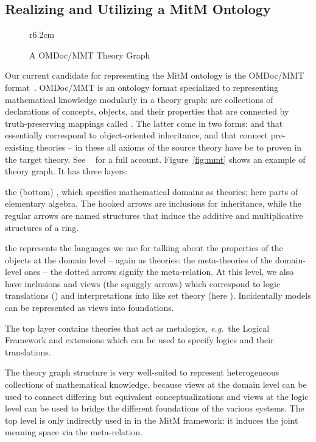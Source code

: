 \subsection{Realizing and Utilizing a MitM Ontology}

\begin{wrapfigure}r{6.2cm}\centering\vspace*{-2em}
  \vspace*{-.5em}
  \caption{A OMDoc/MMT Theory Graph}\label{fig:mmt}\vspace*{-1em}
  \label{figure.omdoc.example}
\end{wrapfigure}
Our current candidate for representing the MitM ontology is the OMDoc/MMT
format~\cite{Kohlhase:OMDoc1.2,MMTSVN:on}. OMDoc/MMT is an ontology format specialized to
representing mathematical knowledge modularly in a theory graph:  are
collections of declarations of concepts, objects, and their properties that are connected
by truth-preserving mappings called . The latter come in two
forms:  and  that essentially correspond to
object-oriented inheritance, and  that connect pre-existing theories -- in
these all axioms of the source theory have be to proven in the target theory. See
~\cite{RabKoh:WSMSML13} for a full account. Figure~\ref{fig:mmt} shows an example of
theory graph. It has three layers:
\begin{compactenum}[\em i\rm)]
\item the (bottom) , which specifies mathematical domains as theories; here
  parts of elementary algebra. The hooked arrows are inclusions for inheritance, while the
  regular arrows are named structures that induce the additive and multiplicative
  structures of a ring.
\item the  represents the languages we use for talking about the
  properties of the objects at the domain level -- again as theories: the meta-theories of
  the domain-level ones -- the dotted arrows signify the meta-relation. At this level, we
  also have inclusions and views (the squiggly arrows) which correspond to logic
  translations () and interpretations into  like
  set theory (here ). Incidentally models can be represented as views into
  foundations.
\item The top layer contains theories that act as metalogics, \emph{e.g.}\ the Logical Framework
   and extensions which can be used to specify logics and their translations.
\end{compactenum}
The theory graph structure is very well-suited to represent heterogeneous collections of
mathematical knowledge, because views at the domain level can be used to connect differing
but equivalent conceptualizations and views at the logic level can be used to bridge the
different foundations of the various systems. The top level is only indirectly used in in
the MitM framework: it induces the joint meaning space via the meta-relation.

